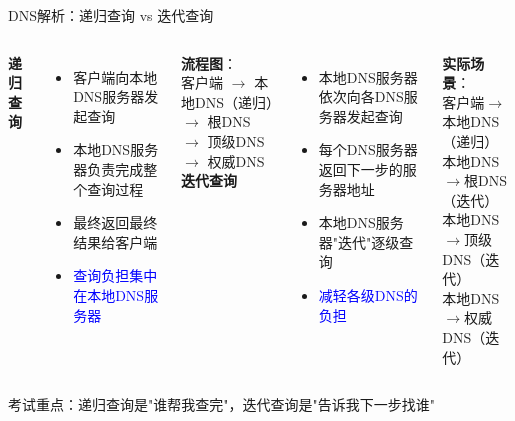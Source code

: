 \documentclass[10pt, aspectratio=169]{beamer}
\begin{document}
\begin{frame}{DNS解析：递归查询 vs 迭代查询}
    \begin{columns}[T]
        \textbf{递归查询}
        \begin{itemize}
            \item 客户端向本地DNS服务器发起查询
            \item 本地DNS服务器负责完成整个查询过程
            \item 最终返回最终结果给客户端
            \item \textcolor{blue}{查询负担集中在本地DNS服务器}
        \end{itemize}
        \vspace{0.3em}
        \textbf{流程图}：\\
        客户端 $\to$ 本地DNS（递归）$\to$ 根DNS\\
        \hspace{4.5em}$\to$ 顶级DNS $\to$ 权威DNS
        \textbf{迭代查询}
        \begin{itemize}
            \item 本地DNS服务器依次向各DNS服务器发起查询
            \item 每个DNS服务器返回下一步的服务器地址
            \item 本地DNS服务器"迭代"逐级查询
            \item \textcolor{blue}{减轻各级DNS的负担}
        \end{itemize}
        \vspace{0.3em}
        \textbf{实际场景}：\\
        客户端$\to$本地DNS（递归）\\
        本地DNS$\to$根DNS（迭代）\\
        本地DNS$\to$顶级DNS（迭代）\\
        本地DNS$\to$权威DNS（迭代）
    \end{columns}
    \vspace{0.3em}
    \alert{考试重点：递归查询是"谁帮我查完"，迭代查询是"告诉我下一步找谁"}
\end{frame}
\end{document}

